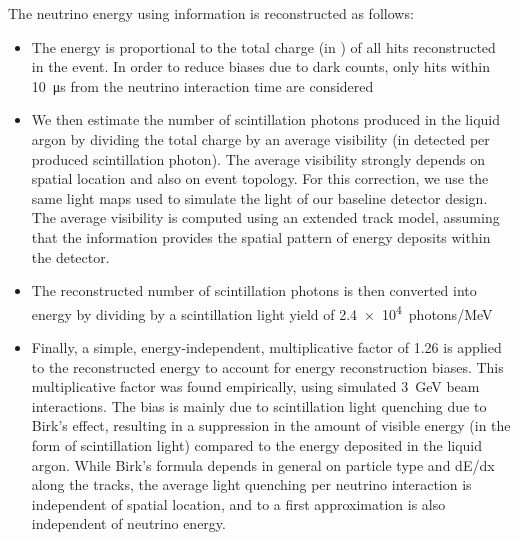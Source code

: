 The neutrino energy using  information is reconstructed as follows:
\begin{itemize}
\item The energy is proportional to the total charge (in ) of all  hits reconstructed in the event. In order to reduce biases due to  dark counts, only hits within \SI{10}{\micro s} from the neutrino interaction time are considered
%
\item We then estimate the number of scintillation photons produced in the liquid argon by dividing the total charge by an average  visibility (in detected  per produced scintillation photon). The average visibility strongly depends  on spatial location and also on event topology. For this correction, we use the same light maps used to simulate the light of our baseline detector design. The average visibility is computed using an extended track model, assuming that the  information provides the spatial pattern of energy deposits within the detector. 
%
\item The reconstructed number of scintillation photons is then converted into energy by dividing by a scintillation light yield of \SI{2.4e4}{photons/MeV}
%
\item Finally, a simple, energy-independent, multiplicative factor of 1.26 is applied to the reconstructed energy to account for energy reconstruction biases. This multiplicative factor was found empirically, using simulated \SI{3}{\GeV} beam \nue {} interactions. The bias is mainly due to scintillation light quenching due to Birk's effect, resulting in a suppression in the amount of visible energy (in the form of scintillation light) compared to the energy deposited in the liquid argon. While Birk's formula depends in general on particle type and dE/dx along the tracks, the average light quenching per neutrino interaction is independent of spatial location, and to a first approximation is also independent of neutrino energy. 
\end{itemize}

